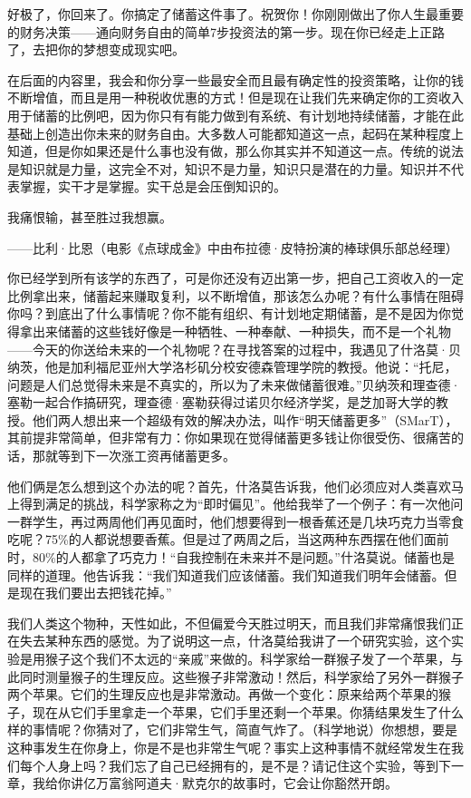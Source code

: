 好极了，你回来了。你搞定了储蓄这件事了。祝贺你！你刚刚做出了你人生最重要的财务决策——通向财务自由的简单7步投资法的第一步。现在你已经走上正路了，去把你的梦想变成现实吧。

在后面的内容里，我会和你分享一些最安全而且最有确定性的投资策略，让你的钱不断增值，而且是用一种税收优惠的方式！但是现在让我们先来确定你的工资收入用于储蓄的比例吧，因为你只有有能力做到有系统、有计划地持续储蓄，才能在此基础上创造出你未来的财务自由。大多数人可能都知道这一点，起码在某种程度上知道，但是你如果还是什么事也没有做，那么你其实并不知道这一点。传统的说法是知识就是力量，这完全不对，知识不是力量，知识只是潜在的力量。知识并不代表掌握，实干才是掌握。实干总是会压倒知识的。

\begin{BookQuote}
我痛恨输，甚至胜过我想赢。

\hfill ——比利·比恩（电影《点球成金》中由布拉德·皮特扮演的棒球俱乐部总经理）
\end{BookQuote}

你已经学到所有该学的东西了，可是你还没有迈出第一步，把自己工资收入的一定比例拿出来，储蓄起来赚取复利，以不断增值，那该怎么办呢？有什么事情在阻碍你吗？到底出了什么事情呢？你不能有组织、有计划地定期储蓄，是不是因为你觉得拿出来储蓄的这些钱好像是一种牺牲、一种奉献、一种损失，而不是一个礼物——今天的你送给未来的一个礼物呢？在寻找答案的过程中，我遇见了什洛莫·贝纳茨，他是加利福尼亚州大学洛杉矶分校安德森管理学院的教授。他说：“托尼，问题是人们总觉得未来是不真实的，所以为了未来做储蓄很难。”贝纳茨和理查德·塞勒一起合作搞研究，理查德·塞勒获得过诺贝尔经济学奖，是芝加哥大学的教授。他们两人想出来一个超级有效的解决办法，叫作“明天储蓄更多”（SMarT），其前提非常简单，但非常有力：你如果现在觉得储蓄更多钱让你很受伤、很痛苦的话，那就等到下一次涨工资再储蓄更多。

他们俩是怎么想到这个办法的呢？首先，什洛莫告诉我，他们必须应对人类喜欢马上得到满足的挑战，科学家称之为“即时偏见”。他给我举了一个例子：有一次他问一群学生，再过两周他们再见面时，他们想要得到一根香蕉还是几块巧克力当零食吃呢？75\%的人都说想要香蕉。但是过了两周之后，当这两种东西摆在他们面前时，80\%的人都拿了巧克力！“自我控制在未来并不是问题。”什洛莫说。储蓄也是同样的道理。他告诉我：“我们知道我们应该储蓄。我们知道我们明年会储蓄。但是现在我们要出去把钱花掉。”

我们人类这个物种，天性如此，不但偏爱今天胜过明天，而且我们非常痛恨我们正在失去某种东西的感觉。为了说明这一点，什洛莫给我讲了一个研究实验，这个实验是用猴子这个我们不太远的“亲戚”来做的。科学家给一群猴子发了一个苹果，与此同时测量猴子的生理反应。这些猴子非常激动！然后，科学家给了另外一群猴子两个苹果。它们的生理反应也是非常激动。再做一个变化：原来给两个苹果的猴子，现在从它们手里拿走一个苹果，它们手里还剩一个苹果。你猜结果发生了什么样的事情呢？你猜对了，它们非常生气，简直气炸了。（科学地说）你想想，要是这种事发生在你身上，你是不是也非常生气呢？事实上这种事情不就经常发生在我们每个人身上吗？我们忘了自己已经拥有的，是不是？请记住这个实验，等到下一章，我给你讲亿万富翁阿道夫·默克尔的故事时，它会让你豁然开朗。

